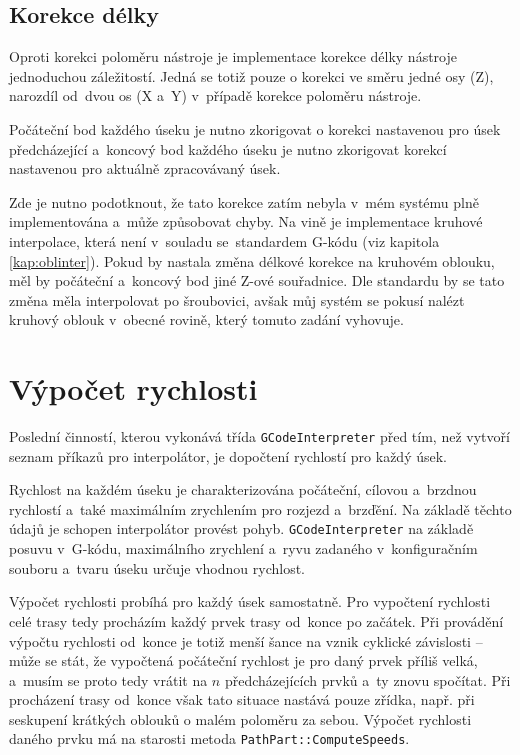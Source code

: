 		\subsection{Korekce délky}
		Oproti korekci poloměru nástroje je implementace korekce délky nástroje jednoduchou záležitostí. Jedná se totiž pouze o korekci ve směru jedné osy (Z), narozdíl od~dvou os (X a~Y) v~případě korekce poloměru nástroje.
		
		Počáteční bod každého úseku je nutno zkorigovat o korekci nastavenou pro úsek předcházející a~koncový bod každého úseku je nutno zkorigovat korekcí nastavenou pro aktuálně zpracovávaný úsek.
		
		Zde je nutno podotknout, že tato korekce zatím nebyla v~mém systému plně implementována a~může způsobovat chyby. Na vině je implementace kruhové interpolace, která není v~souladu se~standardem G-kódu (viz kapitola \ref{kap:oblinter}). Pokud by nastala změna délkové korekce na kruhovém oblouku, měl by počáteční a~koncový bod jiné Z-ové souřadnice. Dle standardu by se tato změna měla interpolovat po šroubovici, avšak můj systém se pokusí nalézt kruhový oblouk v~obecné rovině, který tomuto zadání vyhovuje.
		
		
	\section{Výpočet rychlosti}\label{kap:rychlost}
	Poslední činností, kterou vykonává třída {\tt GCodeInterpreter} před tím, než vytvoří seznam příkazů pro interpolátor, je dopočtení rychlostí pro každý úsek.
	
	Rychlost na každém úseku je charakterizována počáteční, cílovou a~brzdnou rychlostí a~také maximálním zrychlením pro rozjezd a~brzďění. Na základě těchto údajů je schopen interpolátor provést pohyb. {\tt GCodeInterpreter} na základě posuvu v~G-kódu, maximálního zrychlení a~ryvu zadaného v~konfiguračním souboru a~tvaru úseku určuje vhodnou rychlost.
	
	Výpočet rychlosti probíhá pro každý úsek samostatně. Pro vypočtení rychlosti celé trasy tedy procházím každý prvek trasy od~konce po začátek. Při provádění výpočtu rychlosti od~konce je totiž menší šance na vznik cyklické závislosti -- může se stát, že vypočtená počáteční rychlost je pro daný prvek příliš velká, a~musím se proto tedy vrátit na $n$ předcházejících prvků a~ty znovu spočítat. Při procházení trasy od~konce však tato situace nastává pouze zřídka, např. při seskupení krátkých oblouků o malém poloměru za sebou. Výpočet rychlosti daného prvku má na starosti metoda {\tt PathPart::ComputeSpeeds}.
	

